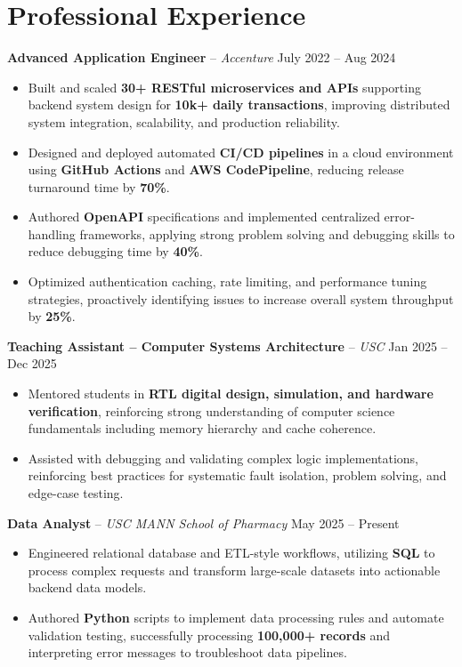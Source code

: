\documentclass[letterpaper,11pt]{article}
\begin{document}
\section*{Professional Experience}
\textbf{Advanced Application Engineer} -- \textit{Accenture} \hfill July 2022 -- Aug 2024
\begin{itemize}
\item Built and scaled \textbf{30+ RESTful microservices and APIs} supporting backend system design for \textbf{10k+ daily transactions}, improving distributed system integration, scalability, and production reliability.
\item Designed and deployed automated \textbf{CI/CD pipelines} in a cloud environment using \textbf{GitHub Actions} and \textbf{AWS CodePipeline}, reducing release turnaround time by \textbf{70\%}.
\item Authored \textbf{OpenAPI} specifications and implemented centralized error-handling frameworks, applying strong problem solving and debugging skills to reduce debugging time by \textbf{40\%}.
\item Optimized authentication caching, rate limiting, and performance tuning strategies, proactively identifying issues to increase overall system throughput by \textbf{25\%}.
\end{itemize}

\textbf{Teaching Assistant – Computer Systems Architecture} -- \textit{USC} \hfill Jan 2025 -- Dec 2025
\begin{itemize}
\item Mentored students in \textbf{RTL digital design, simulation, and hardware verification}, reinforcing strong understanding of computer science fundamentals including memory hierarchy and cache coherence.
\item Assisted with debugging and validating complex logic implementations, reinforcing best practices for systematic fault isolation, problem solving, and edge-case testing.
\end{itemize}

\textbf{Data Analyst} -- \textit{USC MANN School of Pharmacy} \hfill May 2025 -- Present
\begin{itemize}
\item Engineered relational database and ETL-style workflows, utilizing \textbf{SQL} to process complex requests and transform large-scale datasets into actionable backend data models.
\item Authored \textbf{Python} scripts to implement data processing rules and automate validation testing, successfully processing \textbf{100,000+ records} and interpreting error messages to troubleshoot data pipelines.
\end{itemize}
\end{document}
